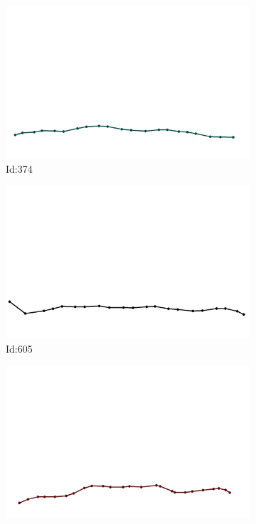 \documentclass[12pt,twoside]{report}
\begin{document}
\begin{figure}
\centering
\begin{subfigure}[b]{0.20\textwidth}
\centering
\includegraphics[width=\textwidth]{../../trajectories/374.png}
\caption{Id:374}
\end{subfigure}
\begin{subfigure}[b]{0.20\textwidth}
\centering
\includegraphics[width=\textwidth]{../../trajectories/605.png}
\caption{Id:605}
\end{subfigure}
\begin{subfigure}[b]{0.20\textwidth}
\centering
\includegraphics[width=\textwidth]{../../trajectories/848.png}

\end{subfigure}
\end{figure}
\end{document}
